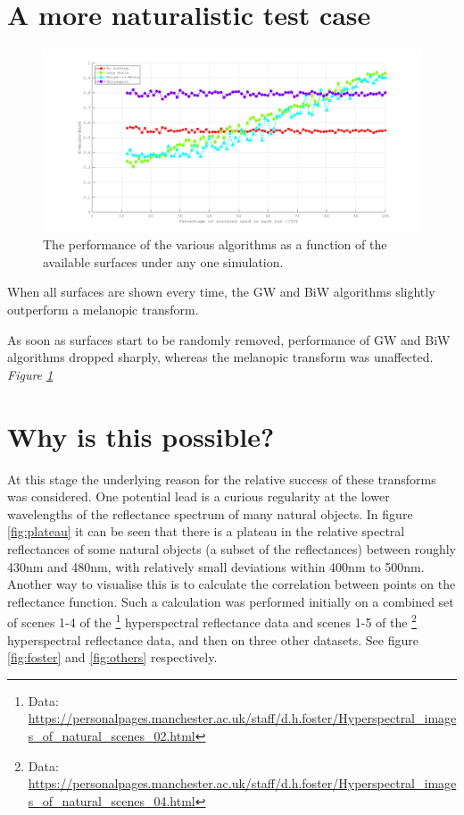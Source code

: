 
\section{A more naturalistic test case}

\begin{figure}[htbp]
 \includegraphics[max width=\textwidth]{figs/comp/melcomp_9/4a_summary.png}
 \caption{The performance of the various algorithms as a function of the available surfaces under any one simulation.}
 \label{fig:4asum}
\end{figure} 

When all surfaces are shown every time, the \gls{GW} and \gls{BiW} algorithms slightly outperform a melanopic transform.


As soon as surfaces start to be randomly removed, performance of \gls{GW} and \gls{BiW} algorithms dropped sharply, whereas the melanopic transform was unaffected. \emph{Figure \ref{fig:4asum}}


\section{Why is this possible?}


At this stage the underlying reason for the relative success of these transforms was considered. One potential lead is a curious regularity at the lower wavelengths of the reflectance spectrum of many natural objects. In figure \ref{fig:plateau} it can be seen that there is a plateau in the relative spectral reflectances of some natural objects (a subset of the \citet{vrhel_measurement_1994} reflectances) between roughly 430nm and 480nm, with relatively small deviations within 400nm to 500nm. Another way to visualise this is to calculate the correlation between points on the reflectance function. Such a calculation was performed initially on a combined set of scenes 1-4 of the
\citet{nascimento_statistics_2002}\footnote{Data: \url{https://personalpages.manchester.ac.uk/staff/d.h.foster/Hyperspectral_images_of_natural_scenes_02.html}} hyperspectral reflectance data and
scenes 1-5 of the 
\citet{foster_frequency_2006}\footnote{Data: \url{https://personalpages.manchester.ac.uk/staff/d.h.foster/Hyperspectral_images_of_natural_scenes_04.html}}
hyperspectral reflectance data, and then on three other datasets. See figure \ref{fig:foster} and \ref{fig:others} respectively.

